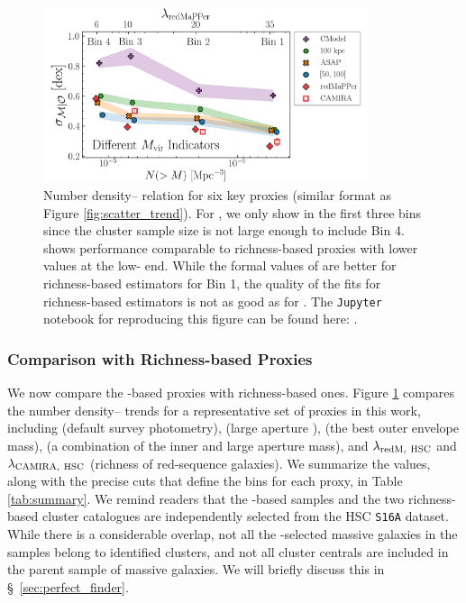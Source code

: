 \documentclass[fleqn,usenatbib,useAMS]{mnras}
\begin{document}
\begin{CJK*}{UTF8}{gbsn}
\begin{figure}
    \centering
    \includegraphics[width=0.85\textwidth]{figure/fig_8}
    \caption{Number density--\sigmvir{} relation for
        six key \mvir{} proxies (similar format as Figure \ref{fig:scatter_trend}).
        For \camira{}, we only show \sigmvir{} in the first three bins since the 
        cluster sample size is not large enough to include Bin 4. 
         shows performance comparable to richness-based proxies with lower \sigmvir{}
        values at the low-\mvir{} end. 
        While the formal values of \sigmvir{} are better for richness-based estimators for Bin 1,
        the quality of the fits for richness-based estimators is not as good as for .
        The \texttt{Jupyter} notebook for reproducing this figure can be found here:
        \href{https://github.com/dr-guangtou/jianbing/blob/master/notebooks/figure/fig8.ipynb}{\faGithub}.
    }
    \label{fig:scatter_trend_2}
\end{figure}

\subsubsection{Comparison with Richness-based Proxies}
    \label{sec:richness_results}

    We now compare the \mstar{}-based proxies with richness-based ones. 
    Figure \ref{fig:scatter_trend_2} compares the number density--\sigmvir{} trends for a 
    representative set of \mvir{} proxies in this work, including \mcmodel{} (default survey
    photometry),  (large aperture \mstar{}),  (the best outer envelope
    mass), \masap{} (a combination of the inner and large aperture mass), and $\lambda_{\rm redM,\
    HSC}$ and $\lambda_{\rm CAMIRA,\ HSC}$ (richness of red-sequence galaxies).
    We summarize the \sigmvir{} values, along with the precise cuts that define the bins for each
    \mvir{} proxy, in Table \ref{tab:summary}. 
    We remind readers that the \mstar{}-based samples and the two richness-based
    cluster catalogues are independently selected from the HSC \texttt{S16A} dataset.
    While there is a considerable overlap, not all the \mstar{}-selected massive galaxies in the
    \topn{} samples belong to identified clusters, and not all cluster centrals are included in the
    parent sample of massive galaxies.
    We will briefly discuss this in \S\ \ref{sec:perfect_finder}.


\end{CJK*}
\end{document}

